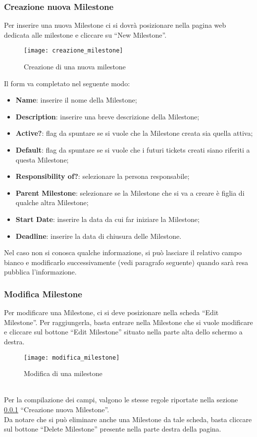 \subsubsection{Creazione nuova Milestone}
\label{sec:creazione_milestone}
Per inserire una nuova Milestone ci si dovrà posizionare nella pagina web dedicata alle milestone e cliccare su ``New Milestone''.
\begin{figure}[h]
\texttt{[image: creazione\_milestone]}
\caption{Creazione di una nuova milestone} \label{fig:creazione_milestone}
\end{figure}
Il form va completato nel seguente modo:
\begin{itemize}
\item \textbf{Name}: inserire il nome della Milestone;
\item \textbf{Description}: inserire una breve descrizione della Milestone;
\item \textbf{Active?}: flag da spuntare se si vuole che la Milestone creata sia quella attiva;
\item \textbf{Default}: flag da spuntare se si vuole che i futuri tickets creati siano riferiti a questa Milestone;
\item \textbf{Responsibility of?}: selezionare la persona responsabile;
\item \textbf{Parent Milestone}: selezionare se la Milestone che si va a creare è figlia di qualche altra Milestone;
\item \textbf{Start Date}: inserire la data da cui far iniziare la Milestone;
\item \textbf{Deadline}: inserire la data di chiusura delle Milestone.
\end{itemize}
Nel caso non si conosca qualche informazione, si può lasciare il relativo campo bianco e modificarlo successivamente (vedi paragrafo seguente) quando sarà resa pubblica l'informazione.

\subsubsection{Modifica Milestone}
Per modificare una Milestone, ci si deve posizionare nella scheda ``Edit Milestone''. Per raggiungerla, basta entrare nella Milestone che si vuole modificare e cliccare sul bottone ``Edit Milestone'' situato nella parte alta dello schermo a destra.
\begin{figure}[h]
\texttt{[image: modifica\_milestone]}
\caption{Modifica di una milestone} \label{fig:modifica_milestone}
\end{figure}
\\Per la compilazione dei campi, valgono le stesse regole riportate nella sezione \ref{sec:creazione_milestone} ``Creazione nuova Milestone''.
\\Da notare che si può eliminare anche una Milestone da tale scheda, basta cliccare sul bottone ``Delete Milestone'' presente nella parte destra della pagina.

